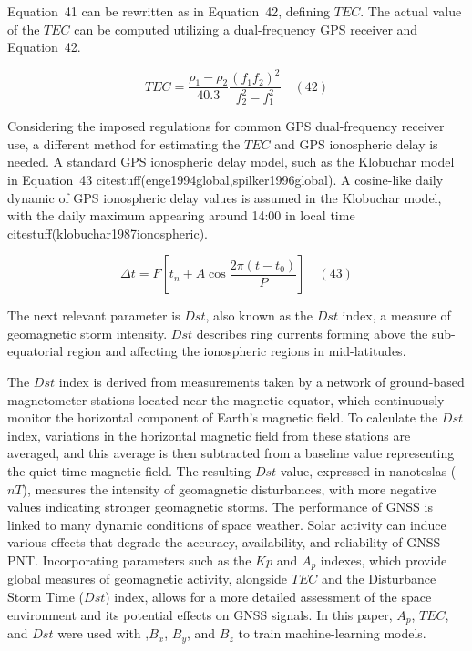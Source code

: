 \documentclass[preprint,12pt]{elsarticle}
\begin{document}
Equation~41 can be rewritten as in Equation~42, defining $TEC$. The actual value of the $TEC$ can be computed utilizing a dual-frequency GPS receiver and Equation~42.

\begin{equation}
	TEC = \frac{\rho_{1} - \rho_{2}}{40.3} \frac{{\left(f_{1}f_{2}\right)}^{2}}{f_{2}^{2}-f_{1}^{2}}
	\quad\left(42\right)
\end{equation}

Considering the imposed regulations for common GPS dual-frequency receiver use, a different method for estimating the $TEC$ and GPS ionospheric delay is needed. A standard GPS ionospheric delay model, such as the Klobuchar model in Equation~43 citestuff(enge1994global,spilker1996global). A cosine-like daily dynamic of GPS ionospheric delay values is assumed in the Klobuchar model, with the daily maximum appearing around 14:00 in local time citestuff(klobuchar1987ionospheric).

\begin{equation}
	\Delta t = F \left[ t_{n} + A \cos \frac{2\pi\left(t-t_{0}\right)}{P} \right]
	\quad\left(43\right)
\end{equation}

The next relevant parameter is $Dst$, also known as the $Dst$ index, a measure of geomagnetic storm intensity. $Dst$ describes ring currents forming above the sub-equatorial region and affecting the ionospheric regions in mid-latitudes.

The $Dst$ index is derived from measurements taken by a network of ground-based magnetometer stations located near the magnetic equator, which continuously monitor the horizontal component of Earth's magnetic field. To calculate the $Dst$ index, variations in the horizontal magnetic field from these stations are averaged, and this average is then subtracted from a baseline value representing the quiet-time magnetic field. The resulting $Dst$ value, expressed in nanoteslas ($nT$), measures the intensity of geomagnetic disturbances, with more negative values indicating stronger geomagnetic storms. The performance of GNSS is linked to many dynamic conditions of space weather. Solar activity can induce various effects that degrade the accuracy, availability, and reliability of GNSS PNT. Incorporating parameters such as the $Kp$ and $A_p$ indexes, which provide global measures of geomagnetic activity, alongside $TEC$ and the Disturbance Storm Time ($Dst$) index, allows for a more detailed assessment of the space environment and its potential effects on GNSS signals. In this paper, $A_p$, $TEC$, and $Dst$ were used with ,$B_x$, $B_y$, and $B_z$ to train machine-learning models.
\end{document}
